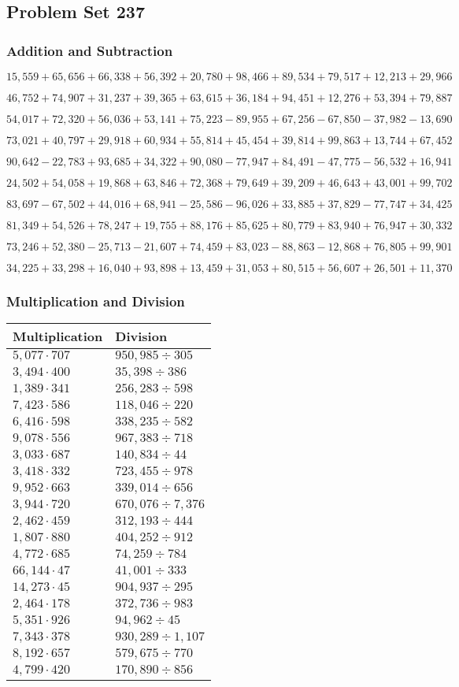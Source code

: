 \hypertarget{problem-set-237}{%
\subsection{Problem Set 237}\label{problem-set-237}}

\hypertarget{addition-and-subtraction}{%
\subsubsection{Addition and
Subtraction}\label{addition-and-subtraction}}

\(15,559+65,656+66,338+56,392+20,780+98,466+89,534+79,517+12,213+29,966\)

\(46,752+74,907+31,237+39,365+63,615+36,184+94,451+12,276+53,394+79,887\)

\(54,017+72,320+56,036+53,141+75,223-89,955+67,256-67,850-37,982-13,690\)

\(73,021+40,797+29,918+60,934+55,814+45,454+39,814+99,863+13,744+67,452\)

\(90,642-22,783+93,685+34,322+90,080-77,947+84,491-47,775-56,532+16,941\)

\(24,502+54,058+19,868+63,846+72,368+79,649+39,209+46,643+43,001+99,702\)

\(83,697-67,502+44,016+68,941-25,586-96,026+33,885+37,829-77,747+34,425\)

\(81,349+54,526+78,247+19,755+88,176+85,625+80,779+83,940+76,947+30,332\)

\(73,246+52,380-25,713-21,607+74,459+83,023-88,863-12,868+76,805+99,901\)

\(34,225+33,298+16,040+93,898+13,459+31,053+80,515+56,607+26,501+11,370\)

\hypertarget{multiplication-and-division}{%
\subsubsection{Multiplication and
Division}\label{multiplication-and-division}}

\begin{longtable}[]{@{}ll@{}}
\toprule
Multiplication & Division\tabularnewline
\midrule
\endhead
\(5,077\cdot707\) & \(950,985÷305\)\tabularnewline
\(3,494\cdot400\) & \(35,398÷386\)\tabularnewline
\(1,389\cdot341\) & \(256,283÷598\)\tabularnewline
\(7,423\cdot586\) & \(118,046÷220\)\tabularnewline
\(6,416\cdot598\) & \(338,235÷582\)\tabularnewline
\(9,078\cdot556\) & \(967,383÷718\)\tabularnewline
\(3,033\cdot687\) & \(140,834÷44\)\tabularnewline
\(3,418\cdot332\) & \(723,455÷978\)\tabularnewline
\(9,952\cdot663\) & \(339,014÷656\)\tabularnewline
\(3,944\cdot720\) & \(670,076÷7,376\)\tabularnewline
\(2,462\cdot459\) & \(312,193÷444\)\tabularnewline
\(1,807\cdot880\) & \(404,252÷912\)\tabularnewline
\(4,772\cdot685\) & \(74,259÷784\)\tabularnewline
\(66,144\cdot47\) & \(41,001÷333\)\tabularnewline
\(14,273\cdot45\) & \(904,937÷295\)\tabularnewline
\(2,464\cdot178\) & \(372,736÷983\)\tabularnewline
\(5,351\cdot926\) & \(94,962÷45\)\tabularnewline
\(7,343\cdot378\) & \(930,289÷1,107\)\tabularnewline
\(8,192\cdot657\) & \(579,675÷770\)\tabularnewline
\(4,799\cdot420\) & \(170,890÷856\)\tabularnewline
\bottomrule
\end{longtable}
